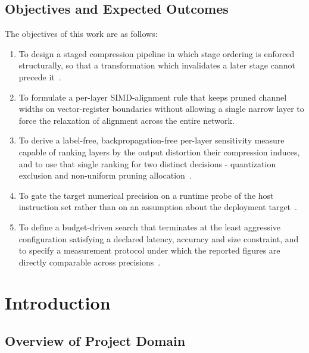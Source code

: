 \documentclass[oneside,a4paper,12pt]{report}
\begin{document}
\section{Objectives and Expected Outcomes }  
The objectives of this work are as follows:
\vspace*{0.5\baselineskip}

\begin{enumerate}
\item To design a staged compression pipeline in which stage ordering is enforced structurally, so that a transformation which invalidates a later stage cannot precede it~\cite{chae2026,wang2025}.
\vspace*{0.5\baselineskip}

\item To formulate a per-layer SIMD-alignment rule that keeps pruned channel widths on vector-register boundaries without allowing a single narrow layer to force the relaxation of alignment across the entire network.
\vspace*{0.5\baselineskip}

\item To derive a label-free, backpropagation-free per-layer sensitivity measure capable of ranking layers by the output distortion their compression induces, and to use that single ranking for two distinct decisions - quantization exclusion and non-uniform pruning allocation~\cite{he2018,abdelsalam2025}.
\vspace*{0.5\baselineskip}

\item To gate the target numerical precision on a runtime probe of the host instruction set rather than on an assumption about the deployment target~\cite{chen2021,fang2026}.
\vspace*{0.5\baselineskip}

\item To define a budget-driven search that terminates at the least aggressive configuration satisfying a declared latency, accuracy and size constraint, and to specify a measurement protocol under which the reported figures are directly comparable across precisions~\cite{he2018}.
\vspace*{0.5\baselineskip}
\end{enumerate}
\newpage
\vspace{-1cm}
\chapter{Introduction}
\section{Overview of Project Domain}
\end{document}
